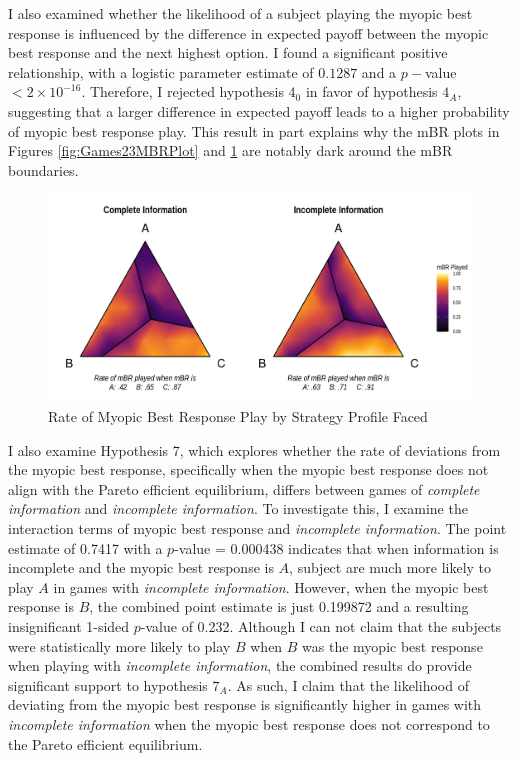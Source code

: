 I also examined whether the likelihood of a subject playing the myopic best response is influenced by the difference in expected payoff between the myopic best response and the next highest option. 
I found a significant positive relationship, with a logistic parameter estimate of 
$0.1287$ and a $p-$value $<2 \times 10^{-16}$. Therefore, I rejected hypothesis $4_0$ in favor of hypothesis $4_A$, suggesting that a larger difference in expected payoff leads to a higher probability of myopic best response play. This result in part explains why the mBR plots in Figures \ref{fig:Games23MBRPlot} and \ref{fig:GamesCIMBRPlot} are notably dark around the mBR boundaries.


\begin{figure}[h]
\captionsetup{justification=centering}
  \caption[caption]{Rate of Myopic Best Response Play by Strategy Profile Faced}
   \label{fig:GamesCIMBRPlot}
    \includegraphics[width = \textwidth]{Images/GamesCIMBRPlot.png}
\end{figure}

I also examine Hypothesis 7, which explores whether the rate of deviations from the myopic best response, specifically when the myopic best response does not align with the Pareto efficient equilibrium, differs between games of \textit{complete information} and \textit{incomplete information}. To investigate this, I examine the interaction terms of myopic best response and \textit{incomplete information}. The point estimate of 0.7417 with a $p$-value = 0.000438 indicates that when information is incomplete and the myopic best response is $A$, subject are much more likely to play $A$ in games with \textit{incomplete information}. However, when the myopic best response is $B$, the combined point estimate is just 0.199872 and a resulting insignificant 1-sided $p$-value of 0.232. Although I can not claim that the subjects were statistically more likely to play $B$ when $B$ was the myopic best response when playing with \textit{incomplete information}, the combined results do provide significant support to hypothesis $7_A$. As such, I claim that the likelihood of deviating from the myopic best response is significantly higher in games with \textit{incomplete information} when the myopic best response does not correspond to the Pareto efficient equilibrium.


